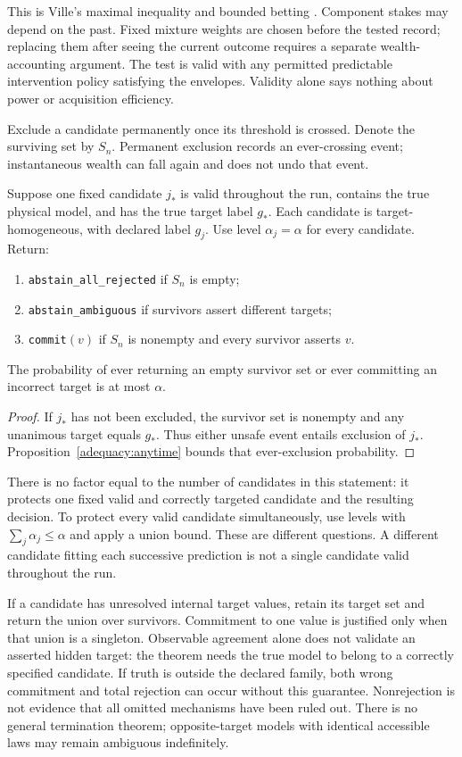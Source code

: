 This is Ville's maximal inequality and bounded betting
\cite{caVille1939,caWaudbySmithRamdas2024}. Component stakes may depend on the
past. Fixed mixture weights are chosen before the tested record; replacing them
after seeing the current outcome requires a separate wealth-accounting argument.
The test is valid with any permitted predictable intervention policy satisfying
the envelopes. Validity alone says nothing about power or acquisition efficiency.

Exclude a candidate permanently once its threshold is crossed. Denote the
surviving set by $S_n$. Permanent exclusion records an ever-crossing event;
instantaneous wealth can fall again and does not undo that event.

\begin{theorem}
\label{adequacy:commit}
Suppose one fixed candidate $j_*$ is valid throughout the run, contains the true
physical model, and has the true target label $g_*$. Each candidate is
target-homogeneous, with declared label $g_j$. Use level $\alpha_j=\alpha$
for every candidate. Return:
\begin{enumerate}
 \item \texttt{abstain\_all\_rejected} if $S_n$ is empty;
 \item \texttt{abstain\_ambiguous} if survivors assert different targets;
 \item \texttt{commit}$(v)$ if $S_n$ is nonempty and every survivor asserts $v$.
\end{enumerate}
The probability of ever returning an empty survivor set or ever committing an
incorrect target is at most $\alpha$.
\end{theorem}
\begin{proof}
If $j_*$ has not been excluded, the survivor set is nonempty and any unanimous
target equals $g_*$. Thus either unsafe event entails exclusion of $j_*$.
Proposition~\ref{adequacy:anytime} bounds that ever-exclusion probability.
\end{proof}

There is no factor equal to the number of candidates in this statement: it
protects one fixed valid and correctly targeted candidate and the resulting
decision. To protect every valid candidate simultaneously, use levels with
$\sum_j\alpha_j\leq\alpha$ and apply a union bound. These are different
questions. A different candidate fitting each successive prediction is not a
single candidate valid throughout the run.

If a candidate has unresolved internal target values, retain its target set
and return the union over survivors. Commitment to one value is justified only
when that union is a singleton. Observable agreement alone does not validate an
asserted hidden target: the theorem needs the true model to belong to a
correctly specified candidate. If truth is outside the declared family, both
wrong commitment and total rejection can occur without this guarantee.
Nonrejection is not evidence that all omitted mechanisms have been ruled out.
There is no general termination theorem; opposite-target models with identical
accessible laws may remain ambiguous indefinitely.

